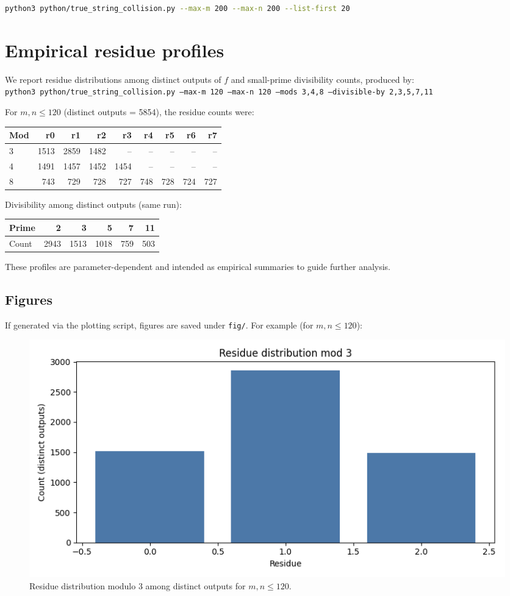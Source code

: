 \documentclass[12pt,a4paper]{article}
\begin{document}
\begin{lstlisting}[language=bash,caption=Example usage]
python3 python/true_string_collision.py --max-m 200 --max-n 200 --list-first 20
\end{lstlisting}

\section{Empirical residue profiles}
We report residue distributions among distinct outputs of \(f\) and small-prime divisibility counts, produced by:\\
\texttt{python3 python/true\_string\_collision.py --max-m 120 --max-n 120 --mods 3,4,8 --divisible-by 2,3,5,7,11}

For \(m,n\le 120\) (distinct outputs = 5854), the residue counts were:
\begin{center}
\begin{tabular}{l|rrrrrrrr}
Mod & r0 & r1 & r2 & r3 & r4 & r5 & r6 & r7 \\
\hline
3 & 1513 & 2859 & 1482 & -- & -- & -- & -- & -- \\
4 & 1491 & 1457 & 1452 & 1454 & -- & -- & -- & -- \\
8 & 743 & 729 & 728 & 727 & 748 & 728 & 724 & 727 \\
\end{tabular}
\end{center}

Divisibility among distinct outputs (same run):
\begin{center}
\begin{tabular}{l|rrrrr}
Prime & 2 & 3 & 5 & 7 & 11 \\
\hline
Count & 2943 & 1513 & 1018 & 759 & 503 \\
\end{tabular}
\end{center}

These profiles are parameter-dependent and intended as empirical summaries to guide further analysis.

\subsection*{Figures}
If generated via the plotting script, figures are saved under \texttt{fig/}. For example (for \(m,n\le 120\)):
\begin{figure}[h]
\centering
\includegraphics[width=0.7\linewidth]{../fig/residues_mod_3.png}
\caption{Residue distribution modulo 3 among distinct outputs for \(m,n\le 120\).}
\label{fig:mod3}
\end{figure}
\end{document}

